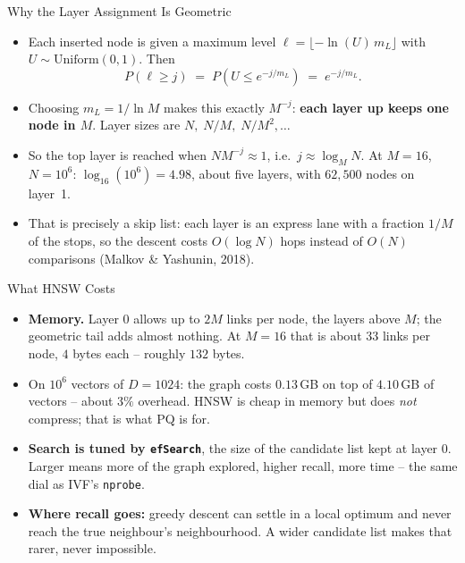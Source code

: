 \begin{frame}{Why the Layer Assignment Is Geometric}
\begin{itemize}
  \item Each inserted node is given a maximum level $\ell = \lfloor -\ln(U)\, m_L \rfloor$ with $U \sim \mathrm{Uniform}(0,1)$. Then
  \vspace{-0.4em}
  \[
    P(\ell \ge j) \;=\; P\!\left(U \le e^{-j/m_L}\right) \;=\; e^{-j/m_L}.
  \]
  \vspace{-1.2em}
  \pause
  \item Choosing $m_L = 1/\ln M$ makes this exactly $M^{-j}$: \textbf{each layer up keeps one node in $M$}. Layer sizes are $N,\; N/M,\; N/M^2, \dots$
  \pause
  \item So the top layer is reached when $N M^{-j} \approx 1$, i.e.\ $j \approx \log_M N$. At $M = 16$, $N = 10^6$: $\log_{16}(10^6) = 4.98$, about five layers, with $62{,}500$ nodes on layer~1.
  \pause
  \item That is precisely a skip list: each layer is an express lane with a fraction $1/M$ of the stops, so the descent costs $O(\log N)$ hops instead of $O(N)$ comparisons (Malkov \& Yashunin, 2018).
\end{itemize}
\end{frame}

\begin{frame}{What HNSW Costs}
\begin{itemize}
  \item \textbf{Memory.} Layer $0$ allows up to $2M$ links per node, the layers above $M$; the geometric tail adds almost nothing. At $M = 16$ that is about $33$ links per node, $4$ bytes each -- roughly $132$ bytes.
  \pause
  \item On $10^6$ vectors of $D = 1024$: the graph costs $0.13$\,GB on top of $4.10$\,GB of vectors -- about $3\%$ overhead. HNSW is cheap in memory but does \emph{not} compress; that is what PQ is for.
  \pause
  \item \textbf{Search is tuned by \texttt{efSearch}}, the size of the candidate list kept at layer $0$. Larger means more of the graph explored, higher recall, more time -- the same dial as IVF's \texttt{nprobe}.
  \pause
  \item \textbf{Where recall goes:} greedy descent can settle in a local optimum and never reach the true neighbour's neighbourhood. A wider candidate list makes that rarer, never impossible.
\end{itemize}
\end{frame}

